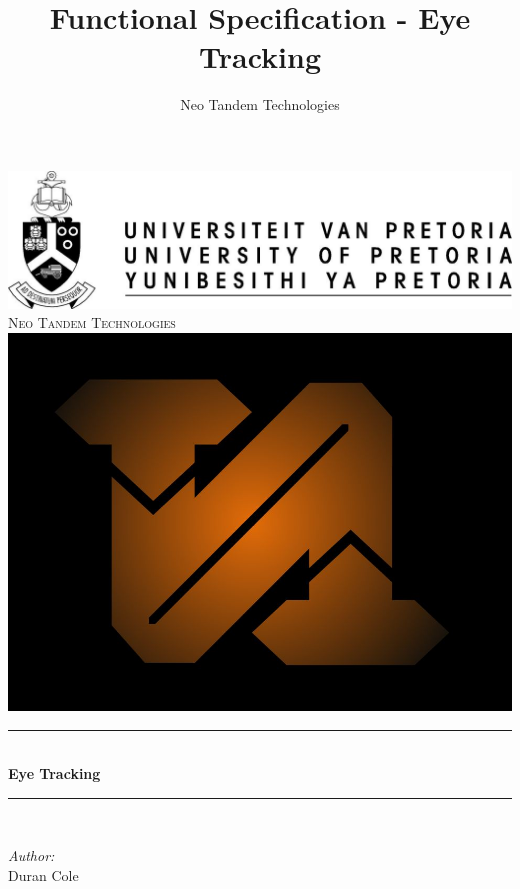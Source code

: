 \documentclass[a4paper,12pt]{report}
\author{Neo Tandem Technologies}
\title{ Functional Specification - Eye Tracking}
\newcommand{\HRule}{\rule{\linewidth}{0.5mm}}
\begin{document}
\setlength{\parskip}{6pt}

\begin{titlepage}

\begin{center}
\includegraphics[scale=1]{../GeneralImages/up-logo.jpg}
\\[1cm]    
    

\textsc{\LARGE Neo Tandem Technologies}\\[1.5cm]
\includegraphics[scale=0.2]{../GeneralImages/NTT.jpg}\\[1.5cm]
\HRule \\[0.4cm]
{ \huge \bfseries Eye Tracking}\\[0.4cm]
\HRule \\[0.4cm]
\begin{minipage}{0.4\textwidth}
\begin{flushleft} \large
\emph{Author:}\\
Duran {Cole}
\end{flushleft}

\end{minipage}
\end{center}
\end{titlepage}
\end{document}

